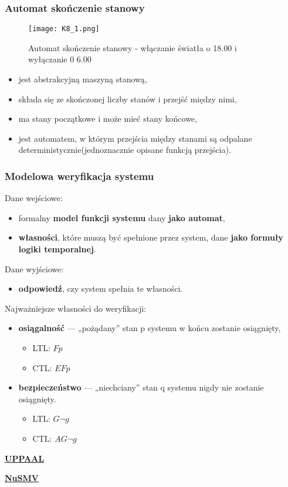 \subsubsection{Automat skończenie stanowy}

\begin{figure}[H]
	\centering
	\texttt{[image: K8\_1.png]}
	\caption{Automat skończenie stanowy - włączanie światła o 18.00 i wyłączanie 0 6.00}
\end{figure}

\begin{itemize}
	\item jest abstrakcyjną maszyną stanową,
	\item składa się ze skończonej liczby stanów i przejść między nimi,
	\item ma stany początkowe i może mieć stany końcowe,
	\item jest automatem, w którym przejścia między stanami są odpalane deterministycznie(jednoznacznie opisane funkcją przejścia).
\end{itemize}

\subsubsection{Modelowa weryfikacja systemu}

Dane wejściowe:
\begin{itemize}
	\item formalny \textbf{model funkcji systemu} dany \textbf{jako automat},
	\item \textbf{własności}, które muszą być spełnione przez system, dane \textbf{jako formuły logiki temporalnej}. \\
\end{itemize}

Dane wyjściowe:
\begin{itemize}
	\item \textbf{odpowiedź}, czy system spełnia te własności. \\
\end{itemize}

Najważniejsze własności do weryfikacji:
\begin{itemize}
	\item \textbf{osiągalność} — „pożądany” stan p systemu w końcu zostanie osiągnięty,
	\begin{itemize}
		\item LTL: $Fp$
		\item CTL: $EFp$
	\end{itemize}
	\item \textbf{bezpieczeństwo} — „niechciany” stan q systemu nigdy nie zostanie osiągnięty. 
	\begin{itemize}
		\item LTL: $G \lnot g$
		\item CTL: $AG \lnot g$
	\end{itemize}
\end{itemize}

\underline{\textbf{UPPAAL}}

\underline{\textbf{NuSMV}}

